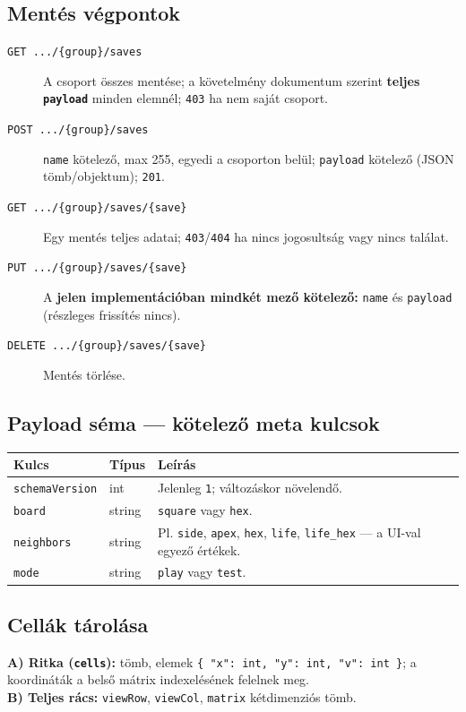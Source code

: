 \subsection{Mentés végpontok}
\begin{description}
  \item[\texttt{GET .../\{group\}/saves}] A csoport összes mentése; a követelmény dokumentum szerint \textbf{teljes \texttt{payload}} minden elemnél; \texttt{403} ha nem saját csoport.
  \item[\texttt{POST .../\{group\}/saves}] \texttt{name} kötelező, max 255, egyedi a csoporton belül; \texttt{payload} kötelező (JSON tömb/objektum); \texttt{201}.
  \item[\texttt{GET .../\{group\}/saves/\{save\}}] Egy mentés teljes adatai; \texttt{403}/\texttt{404} ha nincs jogosultság vagy nincs találat.
  \item[\texttt{PUT .../\{group\}/saves/\{save\}}] A \textbf{jelen implementációban mindkét mező kötelező:} \texttt{name} és \texttt{payload} (részleges frissítés nincs).
  \item[\texttt{DELETE .../\{group\}/saves/\{save\}}] Mentés törlése.
\end{description}

\subsection{Payload séma — kötelező meta kulcsok}
\begin{center}
\begin{tabular}{@{}llp{7cm}@{}}
\toprule
\textbf{Kulcs} & \textbf{Típus} & \textbf{Leírás} \\
\midrule
\texttt{schemaVersion} & int & Jelenleg \texttt{1}; változáskor növelendő. \\
\texttt{board} & string & \texttt{square} vagy \texttt{hex}. \\
\texttt{neighbors} & string & Pl. \texttt{side}, \texttt{apex}, \texttt{hex}, \texttt{life}, \texttt{life\_hex} — a UI-val egyező értékek. \\
\texttt{mode} & string & \texttt{play} vagy \texttt{test}. \\
\bottomrule
\end{tabular}
\end{center}

\subsection{Cellák tárolása}
\textbf{A) Ritka (\texttt{cells}):} tömb, elemek \texttt{\{ "x": int, "y": int, "v": int \}}; a koordináták a belső mátrix indexelésének felelnek meg.\\
\textbf{B) Teljes rács:} \texttt{viewRow}, \texttt{viewCol}, \texttt{matrix} kétdimenziós tömb.

